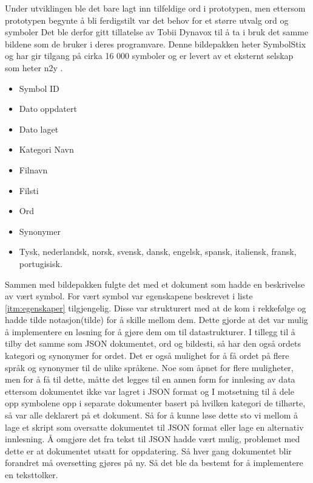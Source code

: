 {Under utviklingen ble det bare lagt inn tilfeldige ord i prototypen, men ettersom prototypen begynte å bli ferdigstilt var det behov for et større utvalg ord og symboler Det ble derfor gitt tillatelse av Tobii Dynavox til å ta i bruk det samme bildene som de bruker i deres programvare. Denne bildepakken heter SymbolStix og har gir tilgang på cirka 16 000 symboler og er levert av et eksternt selskap som heter n2y \cite{n2y}. 

\begin{itemize}
\label{itm:egenskaper}
\item Symbol ID
\item Dato oppdatert
\item Dato laget
\item Kategori Navn 
\item Filnavn
\item Filsti
\item Ord
\item Synonymer
\item Tysk, nederlandsk, norsk, svensk, dansk, engelsk, spansk, italiensk, fransk, portugisisk.
\end{itemize}


Sammen med bildepakken fulgte det med et dokument som hadde en beskrivelse av vært symbol. For vært symbol var egenskapene beskrevet i liste \ref{itm:egenskaper} tilgjengelig. Disse var strukturert med at de kom i rekkefølge og hadde tilde notasjon(tilde) for å skille mellom dem. Dette gjorde at det var mulig å implementere en løsning for å gjøre dem om til datastrukturer. I tillegg til å tilby det samme som JSON dokumentet, ord og bildesti, så har den også ordets kategori og synonymer for ordet. Det er også mulighet for å få ordet på flere språk og synonymer til de ulike språkene. Noe som åpnet for flere muligheter, men for å få til dette, måtte det legges til en annen form for innlesing av data ettersom dokumentet ikke var lagret i JSON format og I motsetning til å dele opp symbolene opp i separate dokumenter basert på hvilken kategori de tilhørte, så var alle deklarert på et dokument. Så for å kunne løse dette sto vi mellom å lage et skript som oversatte dokumentet til JSON format eller lage en alternativ innlesning. Å omgjøre det fra tekst til JSON hadde vært mulig, problemet med dette er at dokumentet utsatt for oppdatering. Så hver gang dokumentet blir forandret må oversetting gjøres på ny. Så det ble da bestemt for å implementere en teksttolker. 

}

